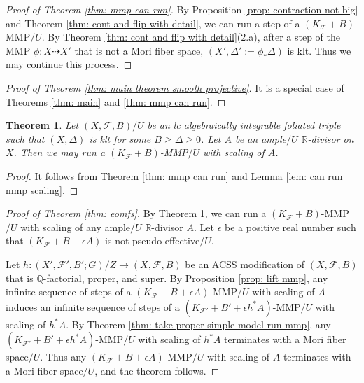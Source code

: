 \documentclass[11pt]{amsart}
\numberwithin{equation}{section}
\newcommand{\Qq}{\mathbb{Q}}
\newcommand{\Rr}{\mathbb{R}}
\newcommand{\Ff}{\mathcal{F}}
\newtheorem{thm}{Theorem}[section]
\theoremstyle{definition}
\theoremstyle{definition}
\theoremstyle{definition}
\begin{document}
\begin{proof}[Proof of Theorem \ref{thm: mmp can run}]
    By Proposition \ref{prop: contraction not big} and Theorem \ref{thm: cont and flip with detail}, we can run a step of a $(K_{\Ff}+B)$-MMP$/U$. By Theorem \ref{thm: cont and flip with detail}(2.a), after a step of the MMP $\phi: X\dashrightarrow X'$ that is not a Mori fiber space, $(X',\Delta':=\phi_*\Delta)$ is klt. Thus we may continue this process. 
\end{proof}

\begin{proof}[Proof of Theorem \ref{thm: main theorem smooth projective}]
    It is a special case of Theorems \ref{thm: main} and \ref{thm: mmp can run}.
\end{proof}

\begin{thm}\label{thm: can run mmp scaling}
      Let $(X,\Ff,B)/U$ be an lc algebraically integrable foliated triple such that $(X,\Delta)$ is klt for some $B\geq\Delta\geq 0$. Let $A$ be an ample$/U$ $\Rr$-divisor on $X$. Then we may run a $(K_{\Ff}+B)$-MMP$/U$ with scaling of $A$. 
\end{thm}
\begin{proof}
    It follows from Theorem \ref{thm: mmp can run} and Lemma \ref{lem: can run mmp scaling}.
\end{proof}

\begin{proof}[Proof of Theorem \ref{thm: eomfs}]
By Theorem \ref{thm: can run mmp scaling}, we can run a $(K_{\Ff}+B)$-MMP$/U$ with scaling of any ample$/U$ $\Rr$-divisor $A$. Let $\epsilon$ be a positive real number such that $(K_{\Ff}+B+\epsilon A)$ is not pseudo-effective$/U$. 

Let $h: (X',\Ff',B';G)/Z\rightarrow (X,\Ff,B)$ be an ACSS modification of $(X,\Ff,B)$ that is $\Qq$-factorial, proper, and super. By Proposition \ref{prop: lift mmp}, any infinite sequence of steps of a $(K_{\Ff}+B+\epsilon A)$-MMP$/U$ with scaling of $A$ induces an infinite sequence of steps of a $(K_{\Ff'}+B'+\epsilon h^*A)$-MMP$/U$ with scaling of $h^*A$. By Theorem \ref{thm: take proper simple model run mmp}, any $(K_{\Ff'}+B'+\epsilon h^*A)$-MMP$/U$ with scaling of $h^*A$ terminates with a Mori fiber space$/U$. Thus any $(K_{\Ff}+B+\epsilon A)$-MMP$/U$ with scaling of $A$ terminates with a Mori fiber space$/U$, and the theorem follows.    
\end{proof}
\end{document}
